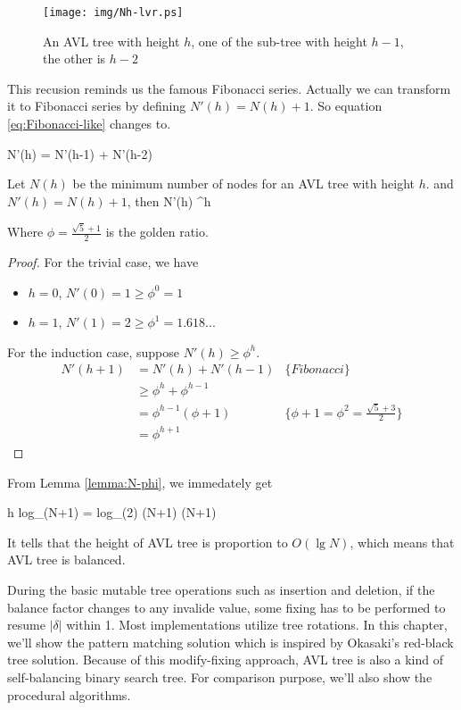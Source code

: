 \documentclass{article}
\begin{document}
\begin{figure}[htbp]
   \centering
   \texttt{[image: img/Nh-lvr.ps]}
   \caption{An AVL tree with height $h$, one of the sub-tree with height $h-1$, the other is $h-2$} \label{fig:N-h-relation}
\end{figure}

This recusion reminds us the famous Fibonacci series. Actually we can 
transform it to Fibonacci series by defining $N'(h) = N(h)+1$. So equation
\ref{eq:Fibonacci-like} changes to.

\be
  N'(h) = N'(h-1) + N'(h-2)
\ee

\begin{lemma}
\label{lemma:N-phi}
Let $N(h)$ be the minimum number of nodes for an AVL tree with
height $h$. and $N'(h) = N(h) + 1$, then
\be
  N'(h) \geq \phi^h
\ee

Where $\phi = \frac{\sqrt{5}+1}{2}$ is the golden ratio.
\end{lemma}

\begin{proof}
For the trivial case, we have
\begin{itemize}
\item $h=0$, $N'(0) = 1 \geq \phi^0 = 1$
\item $h=1$, $N'(1) = 2 \geq \phi^1 = 1.618...$
\end{itemize}

For the induction case, suppose $N'(h) \geq \phi^h$.
\[
  \begin{array}{lll}
  N'(h+1) & = N'(h) + N'(h-1) & \{Fibonacci\} \\
          & \geq \phi^h + \phi^{h-1} & \\
          & = \phi^{h-1}(\phi + 1) & \{\phi + 1 = \phi^2 = \frac{\sqrt{5}+3}{2}\} \\
          & = \phi^{h+1}
 \end{array}
\]
\end{proof}

From Lemma \ref{lemma:N-phi}, we immedately get

\be
  h \leq log_{\phi}(N+1) = log_{\phi}(2) \cdot \lg (N+1)  \lg (N+1)
\ee

It tells that the height of AVL tree is proportion to $O(\lg N)$, which
means that AVL tree is balanced.

During the basic mutable tree operations such as insertion and deletion,
if the balance factor changes to any invalide value, some fixing has
to be performed to resume $|\delta|$ within 1. Most implementations utilize
tree rotations. In this chapter, we'll show the pattern matching solution
which is inspired by Okasaki's red-black tree solution\cite{okasaki}.
Because of this modify-fixing approach, AVL tree is also a kind of 
self-balancing binary search tree. For comparison purpose, we'll also
show the procedural algorithms.
\end{document}
